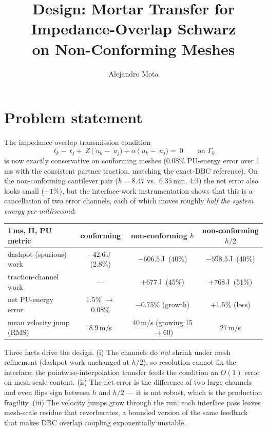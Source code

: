 \documentclass[11pt]{article}
\title{Design: Mortar Transfer for Impedance-Overlap Schwarz \\
on Non-Conforming Meshes}
\author{Alejandro Mota}
\begin{document}
\maketitle

\section{Problem statement}

The impedance-overlap transmission condition
\begin{equation}
  ~t_k - ~t_j
  + ~Z\,\bigl(\dot{~u}_k - \dot{~u}_j\bigr)
  + \alpha\,\bigl(~u_k - ~u_j\bigr) = ~0
  \qquad \text{on } \Gamma_k
  \label{eq:tc}
\end{equation}
is now exactly conservative on conforming meshes (0.08\% PU-energy error
over 1\,ms with the consistent partner traction, matching the
exact-DBC reference).  On the non-conforming cantilever pair
($h = 8.47$ vs.\ $6.35$\,mm, 4:3) the net error also looks small
($\pm 1$\%), but the interface-work instrumentation shows that this is
a cancellation of two error channels, each of which moves roughly
\emph{half the system energy per millisecond}:

\begin{center}
\small
\begin{tabular}{lccc}
\toprule
1\,ms, II, PU metric & conforming & non-conforming $h$ & non-conforming $h/2$ \\
\midrule
dashpot (spurious) work & $-42.6$\,J \,(2.8\%) & $-606.5$\,J \,(40\%) & $-598.5$\,J \,(40\%) \\
traction-channel work & --- & $+677$\,J \,(45\%) & $+768$\,J \,(51\%) \\
net PU-energy error & $1.5$\% $\to$ 0.08\% & $-0.75$\% (growth) & $+1.5$\% (loss) \\
mean velocity jump (RMS) & 8.9\,m/s & 40\,m/s (growing 15$\to$60) & 27\,m/s \\
\bottomrule
\end{tabular}
\end{center}

Three facts drive the design.  (i) The channels do \emph{not} shrink
under mesh refinement (dashpot work unchanged at $h/2$), so resolution
cannot fix the interface; the pointwise-interpolation transfer feeds
the condition an $O(1)$ error on mesh-scale content.  (ii) The net
error is the difference of two large channels and even flips sign
between $h$ and $h/2$ --- it is not robust, which is the production
fragility.  (iii) The velocity jumps grow through the run: each
interface pass leaves mesh-scale residue that reverberates, a bounded
version of the same feedback that makes DBC overlap coupling
exponentially unstable.
\end{document}
